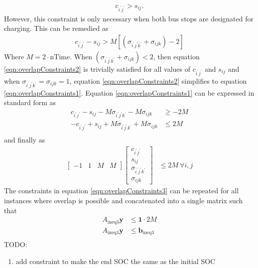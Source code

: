 \begin{align}\label{eqn:overlapConstraints1}
c_{i^{'}j^{'}} > s_{ij}.
\end{align}
However, this constraint is only necessary when both bus stops are designated for charging. This can be remedied as
	\begin{align}\label{eqn:overlapConstraints2}
		c_{i^{'}j^{'}} - s_{ij} > M\left[(\sigma_{i^{'}j^{'}k^{'}} + \sigma_{ijk}) - 2\right]
	\end{align}
	Where $M = 2\cdot\text{nTime}$. When $(\sigma_{i^{'}j^{'}k^{'}} + \sigma_{ijk}) < 2$, then equation \ref{eqn:overlapConstraints2} is trivially satisfied for all values of $c_{i^{'}j^{'}}$ and $s_{ij}$ and when $\sigma_{i^{'}j^{'}k^{'}} = \sigma_{ijk} = 1$, equation \ref{eqn:overlapConstraints2} simplifies to equation \ref{eqn:overlapConstraints1}. Equation \ref{eqn:overlapConstraints1} can be expressed in standard form as 
	\begin{equation}\label{eqn:overlapConstraints3}\begin{aligned}
		c_{i^{'}j^{'}} - s_{ij} - M\sigma_{i^{'}j^{'}k^{'}} - M\sigma_{ijk} &\ge -2M \\
		-c_{i^{'}j^{'}} + s_{ij} + M\sigma_{i^{'}j^{'}k^{'}} + M\sigma_{ijk} &\le 2M \\
	\end{aligned}\end{equation}
	and finally as
	\begin{equation}\begin{aligned} 
		\begin{bmatrix} -1 & 1 & M & M\end{bmatrix} \begin{bmatrix}c_{i^{'}j^{'}}\\ s_{ij} \\ \sigma_{i^{'}j^{'}k^{'}}\\ \sigma_{ijk} \end{bmatrix} &\le 2M \ \forall i,j
	\end{aligned} \end{equation}
	The constraints in equation \ref{eqn:overlapConstraints3} can be repeated for all instances where overlap is possible and concatenated into a single matrix such that
	\begin{equation}\begin{aligned} 
		A_{\text{ineq3}}\mathbf{y} &\le \mathbf{1}\cdot 2M \\
		A_{\text{ineq3}}\mathbf{y} & \le \mathbf{b}_{\text{ineq3}}\\
	\end{aligned} \end{equation} 
	TODO:
	\begin{enumerate}
		\item add constraint to make the end SOC the same as the initial SOC
	\end{enumerate}
